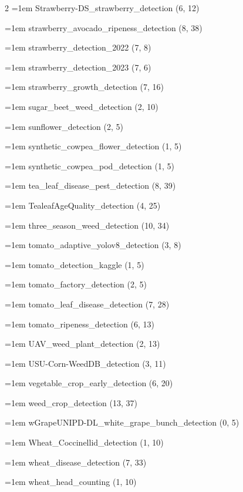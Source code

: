 \begin{multicols}{2}
\hangindent=1em Strawberry-DS\_\allowbreak{}strawberry\_\allowbreak{}detection (6, 12)\par
\hangindent=1em strawberry\_\allowbreak{}avocado\_\allowbreak{}ripeness\_\allowbreak{}detection (8, 38)\par
\hangindent=1em strawberry\_\allowbreak{}detection\_\allowbreak{}2022 (7, 8)\par
\hangindent=1em strawberry\_\allowbreak{}detection\_\allowbreak{}2023 (7, 6)\par
\hangindent=1em strawberry\_\allowbreak{}growth\_\allowbreak{}detection (7, 16)\par
\hangindent=1em sugar\_\allowbreak{}beet\_\allowbreak{}weed\_\allowbreak{}detection (2, 10)\par
\hangindent=1em sunflower\_\allowbreak{}detection (2, 5)\par
\hangindent=1em synthetic\_\allowbreak{}cowpea\_\allowbreak{}flower\_\allowbreak{}detection (1, 5)\par
\hangindent=1em synthetic\_\allowbreak{}cowpea\_\allowbreak{}pod\_\allowbreak{}detection (1, 5)\par
\hangindent=1em tea\_\allowbreak{}leaf\_\allowbreak{}disease\_\allowbreak{}pest\_\allowbreak{}detection (8, 39)\par
\hangindent=1em TealeafAgeQuality\_\allowbreak{}detection (4, 25)\par
\hangindent=1em three\_\allowbreak{}season\_\allowbreak{}weed\_\allowbreak{}detection (10, 34)\par
\hangindent=1em tomato\_\allowbreak{}adaptive\_\allowbreak{}yolov8\_\allowbreak{}detection (3, 8)\par
\hangindent=1em tomato\_\allowbreak{}detection\_\allowbreak{}kaggle (1, 5)\par
\hangindent=1em tomato\_\allowbreak{}factory\_\allowbreak{}detection (2, 5)\par
\hangindent=1em tomato\_\allowbreak{}leaf\_\allowbreak{}disease\_\allowbreak{}detection (7, 28)\par
\hangindent=1em tomato\_\allowbreak{}ripeness\_\allowbreak{}detection (6, 13)\par
\hangindent=1em UAV\_\allowbreak{}weed\_\allowbreak{}plant\_\allowbreak{}detection (2, 13)\par
\hangindent=1em USU-Corn-WeedDB\_\allowbreak{}detection (3, 11)\par
\hangindent=1em vegetable\_\allowbreak{}crop\_\allowbreak{}early\_\allowbreak{}detection (6, 20)\par
\hangindent=1em weed\_\allowbreak{}crop\_\allowbreak{}detection (13, 37)\par
\hangindent=1em wGrapeUNIPD-DL\_\allowbreak{}white\_\allowbreak{}grape\_\allowbreak{}bunch\_\allowbreak{}detection (0, 5)\par
\hangindent=1em Wheat\_\allowbreak{}Coccinellid\_\allowbreak{}detection (1, 10)\par
\hangindent=1em wheat\_\allowbreak{}disease\_\allowbreak{}detection (7, 33)\par
\hangindent=1em wheat\_\allowbreak{}head\_\allowbreak{}counting (1, 10)\par
\end{multicols}

